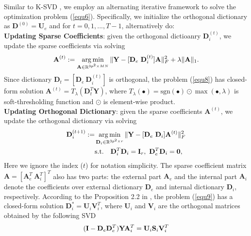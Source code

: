 \documentclass[10pt,twocolumn,letterpaper]{article}
\DeclareMathOperator*{\argmin}{arg\,min}
\begin{document}
Similar to K-SVD \cite{ksvd}, we employ an alternating iterative framework to solve the optimization problem (\ref{equ6}). Specifically, we initialize the orthogonal dictionary as $\mathbf{D}^{(0)}=\mathbf{U}_{e}$ and for $t=0, 1, ..., T-1$, alternatively do:
\\
\textbf{Updating Sparse Coefficients}: given the orthogonal dictioanry $\textbf{D}_{i}^{(t)}$, we update the sparse coefficients via solving
\vspace{-2mm}
\begin{equation}\label{equ8}\vspace{-2mm}
\textbf{A}^{(t)}:=\argmin_{\textbf{A}\in\mathbb{R}^{3p^2\times MN}}
\|\mathbf{Y}-[\mathbf{D}_{e}\ \mathbf{D}_{i}^{(t)}]\mathbf{A}\|_{F}^{2}+\lambda\|\mathbf{A}\|_{1}.
\end{equation}
Since dictionary $\mathbf{D}_{t}=[\mathbf{D}_{e}\ \mathbf{D}_{i}^{(t)}]$ is orthogonal, the problem (\ref{equ8}) has closed-form solution $\mathbf{A}^{(t)}=T_{\lambda}(\mathbf{D}_{t}^{T}\mathbf{Y})$, 
where $T_{\lambda}(\mathbf{\bullet
}) = \text{sgn}(\mathbf{\bullet
})\odot\max(\mathbf{\bullet
},\lambda)$ is soft-thresholding function and $\odot$ is element-wise product.
\\
\textbf{Updating Orthogonal Dictionary}: given the sparse coefficients $\textbf{A}^{(t)}$, we update the orthogonal dictionary via solving
\vspace{-2mm}
\begin{equation}\label{equ9} \vspace{-2mm}
\begin{split}
\textbf{D}_{i}^{(t+1)}:=
&
\argmin_{\textbf{D}_{i}\in\mathbb{R}^{3p^2\times r}}
\|\mathbf{Y}-[\mathbf{D}_{e}\ \mathbf{D}_{i}]\mathbf{A}^{(t)}\|_{F}^{2}
\\
&
\text{s.t.}
\quad
\mathbf{D}_{i}^{T}\mathbf{D}_{i} = \mathbf{I}_{r},\ \mathbf{D}_{e}^{T}\mathbf{D}_{i} = \mathbf{0},
\end{split}
\end{equation}
Here we ignore the index ($t$) for notation simplicity. The sparse coefficient matrix $\mathbf{A}=[\mathbf{A}_{e}^{T}\ \mathbf{A}_{i}^{T}]^{T}$ also has two parts: the external part $\mathbf{A}_{e}$ and the internal part $\mathbf{A}_{i}$ denote the coefficients over external dictionary $\mathbf{D}_{e}$ and internal dictionary $\mathbf{D}_{i}$, respectively. According to the Proposition 2.2 in \cite{bao2013fast}, the problem (\ref{equ9}) 
has a closed-form solution $\mathbf{D}_{i}^{*}=\mathbf{U}_{i}\mathbf{V}_{i}^{T}$, where $\mathbf{U}_{i}$ and $\mathbf{V}_{i}$ are the orthogonal matrices obtained by the following SVD
\vspace{-2mm}
\begin{equation}\label{equ10}\vspace{-2mm}
(\mathbf{I}-\mathbf{D}_{e}\mathbf{D}_{e}^{T})\mathbf{Y}\mathbf{A}_{i}^{T}
=
\mathbf{U}_{i}\mathbf{S}_{i}\mathbf{V}_{i}^{T}
\end{equation}
\end{document}
